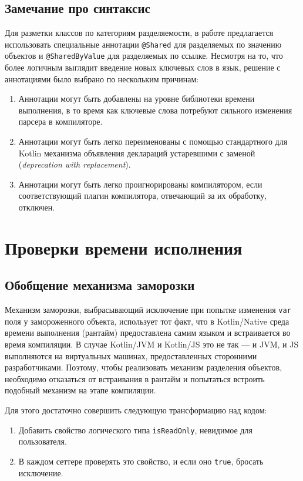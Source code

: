 \documentclass[specification,annotation,times]{itmo-student-thesis}
\begin{document}
\subsection{Замечание про синтаксис}\label{syntax_note}

Для разметки классов по категориям разделяемости, в работе предлагается использовать специальные аннотации \texttt{@Shared} для разделяемых по значению объектов и \texttt{@SharedByValue} для разделяемых по ссылке.
Несмотря на то, что более логичным выглядит введение новых ключевых слов в язык, решение с аннотациями было выбрано по нескольким причинам:

\begin{enumerate}
	\item Аннотации могут быть добавлены на уровне библиотеки времени выполнения, в то время как ключевые слова потребуют сильного изменения парсера в компиляторе.
	\item Аннотации могут быть легко переименованы с помощью стандартного для Kotlin механизма объявления деклараций устаревшими с заменой (\textit{deprecation with replacement}).
	\item Аннотации могут быть легко проигнорированы компилятором, если соответствующий плагин компилятора, отвечающий за их обработку, отключен.
\end{enumerate}

\section{Проверки времени исполнения}

\subsection{Обобщение механизма заморозки}

Механизм заморозки, выбрасывающий исключение при попытке изменения \texttt{var} поля у замороженного объекта, использует тот факт, что в Kotlin/Native среда времени выполнения (рантайм) предоставлена самим языком и встраивается во время компиляции.
В случае Kotlin/JVM и Kotlin/JS это не так –-- и JVM, и JS выполняются на виртуальных машинах, предоставленных сторонними разработчиками.
Поэтому, чтобы реализовать механизм разделения объектов, необходимо отказаться от встраивания в рантайм и попытаться встроить подобный механизм на этапе компиляции.

Для этого достаточно совершить следующую трансформацию над кодом: 

\begin{enumerate}
	\item Добавить свойство логического типа \texttt{isReadOnly}, невидимое для пользователя.
	\item В каждом сеттере проверять это свойство, и если оно \texttt{true}, бросать исключение.
\end{enumerate}
\end{document}

